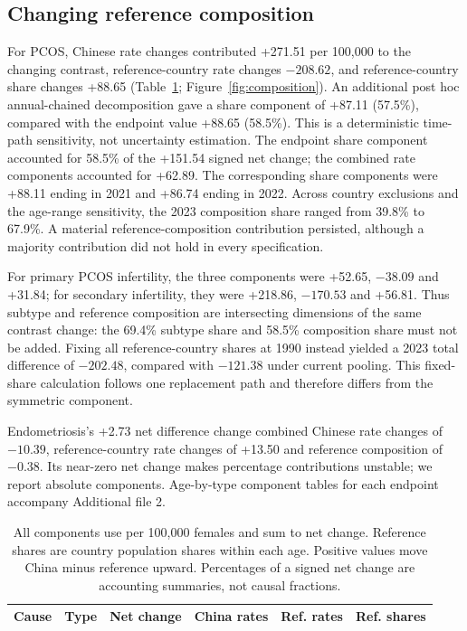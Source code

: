 \documentclass[11pt,a4paper]{article}
\begin{document}
\subsection{Changing reference composition}
For PCOS, Chinese rate changes contributed +271.51 per 100,000 to the changing contrast, reference-country rate changes $-208.62$, and reference-country share changes +88.65 (Table~\ref{tab:composition}; Figure~\ref{fig:composition}). An additional post hoc annual-chained decomposition gave a share component of +87.11 (57.5\%), compared with the endpoint value +88.65 (58.5\%). This is a deterministic time-path sensitivity, not uncertainty estimation. The endpoint share component accounted for 58.5\% of the +151.54 signed net change; the combined rate components accounted for +62.89. The corresponding share components were +88.11 ending in 2021 and +86.74 ending in 2022. Across country exclusions and the age-range sensitivity, the 2023 composition share ranged from 39.8\% to 67.9\%. A material reference-composition contribution persisted, although a majority contribution did not hold in every specification.

For primary PCOS infertility, the three components were +52.65, $-38.09$ and +31.84; for secondary infertility, they were +218.86, $-170.53$ and +56.81. Thus subtype and reference composition are intersecting dimensions of the same contrast change: the 69.4\% subtype share and 58.5\% composition share must not be added. Fixing all reference-country shares at 1990 instead yielded a 2023 total difference of $-202.48$, compared with $-121.38$ under current pooling. This fixed-share calculation follows one replacement path and therefore differs from the symmetric component.

Endometriosis's +2.73 net difference change combined Chinese rate changes of $-10.39$, reference-country rate changes of +13.50 and reference composition of $-0.38$. Its near-zero net change makes percentage contributions unstable; we report absolute components. Age-by-type component tables for each endpoint accompany Additional file 2.

\begin{table}[htbp]\centering\small{}
\caption{Symmetric decomposition of changes in standardized differences, 1990--2023.}\label{tab:composition}
\setlength{\tabcolsep}{3pt}
\begin{tabular}{llrrrr}\toprule
Cause & Type & Net change & China rates & Ref. rates & Ref. shares\\\midrule
\end{tabular}
\caption*{All components use per 100,000 females and sum to net change. Reference shares are country population shares within each age. Positive values move China minus reference upward. Percentages of a signed net change are accounting summaries, not causal fractions.}
\end{table}
\end{document}
